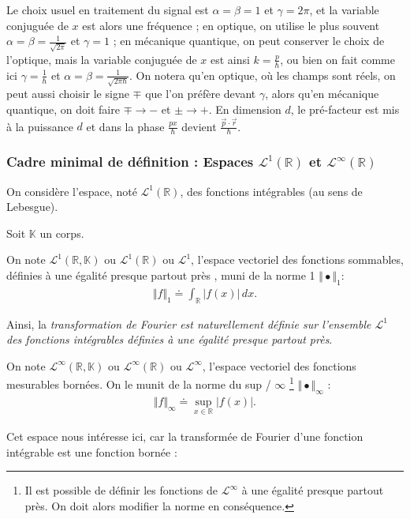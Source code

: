 Le choix usuel en traitement du signal est $\alpha = \beta = 1$ et $\gamma = 2\pi$, et la variable conjuguée de $x$ est alors une fréquence ; en optique, on utilise le plus souvent $\alpha = \beta = \frac{1}{\sqrt{2\pi}}$ et $\gamma = 1$ ; en mécanique quantique, on peut conserver le choix de l’optique, mais la variable conjuguée de $x$ est ainsi $k = \frac{p}{\hbar}$, ou bien on fait comme ici $\gamma = \frac{1}{\hbar}$ et $\alpha = \beta = \frac{1}{\sqrt{2\pi\hbar}}$. On notera qu’en optique, où les champs sont réels, on peut aussi choisir le signe $\mp$ que l’on préfère devant $\gamma$, alors qu’en mécanique quantique, on doit faire $\mp \rightarrow -$ et $\pm \rightarrow +$. En dimension $d$, le pré-facteur est mis à la puissance $d$ et dans la phase $\frac{px}{\hbar}$ devient $\frac{\vec{p} \cdot \vec{r}}{\hbar}$.\\


\subsubsection{Cadre minimal de définition : Espaces $\mathcal L^1(\mathbb R)$ et $\mathcal L^\infty(\mathbb R)$}

On considère l'espace, noté $\mathcal L^1(\mathbb{R})$, des fonctions intégrables (au sens de Lebesgue). 

\smallskip

Soit $\mathbb K$ un corps.



\begin{Defi} On note $\mathcal L^1(\mathbb{R} , \mathbb K)$ ou $\mathcal L^1(\mathbb{R})$ ou $\mathcal L^1$, l'espace vectoriel des fonctions sommables, définies \guillemotleft{} à une égalité presque partout près \guillemotright{}, muni de la norme 1 $\Vert \bullet \Vert_1$:
    \begin{eqnarray}
        \Vert f \Vert_1 \doteq \int_{\mathbb{R}} \vert f(x) \vert \, dx .
    \end{eqnarray}
\end{Defi}

Ainsi, la {\em transformation de Fourier est naturellement définie sur l'ensemble $\mathcal L^1$ des fonctions intégrables définies à une égalité presque partout près}.

\begin{Defi}On note $\mathcal L^\infty(\mathbb{R} , \mathbb K)$ ou $\mathcal L^\infty(\mathbb{R})$ ou $\mathcal L^\infty$, l'espace vectoriel des fonctions mesurables bornées. On le munit de la \guillemotleft{} norme du sup / $\infty$ \footnote{Il est possible de définir les fonctions de $\mathcal L^\infty$ à une égalité presque partout près. On doit alors modifier la norme en conséquence.} \guillemotright{} $\Vert \bullet \Vert_\infty$ : 
    \begin{eqnarray}
        \Vert f \Vert_\infty \doteq \sup_{x \in \mathbb{R}} \vert f (x) \vert  .
    \end{eqnarray}
\end{Defi}
Cet espace nous intéresse ici, car la transformée de Fourier d'une fonction intégrable est une fonction bornée :

